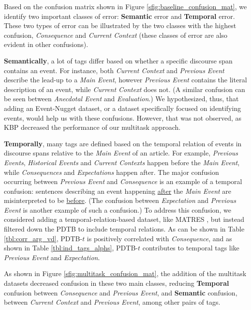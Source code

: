 \documentclass[11pt]{article}
\begin{document}
Based on the confusion matrix shown in Figure \ref{sfig:baseline_confusion_mat}, we identify two important classes of error: \textbf{Semantic} error and \textbf{Temporal} error. These two types of error can be illustrated by the two classes with the highest confusion, \textit{Consequence} and \textit{Current Context} (these classes of error are also evident in other confusions). 

\textbf{Semantically}, a lot of tags differ based on whether a specific discourse span contains an event. For instance, both \textit{Current Context} and \textit{Previous Event} describe the lead-up to a \textit{Main Event}, however \textit{Previous Event} contains the literal description of an event, while \textit{Current Context} does not. (A similar confusion can be seen between \textit{Anecdotal Event} and \textit{Evaluation}.) We hypothesized, thus, that adding an Event-Nugget dataset, or a dataset specifically focused on identifying events, would help us with these confusions. However, that was not observed, as KBP decreased the performance of our multitask approach.

\textbf{Temporally}, many tags are defined based on the temporal relation of events in discourse spans relative to the \textit{Main Event} of an article. For example, \textit{Previous Events}, \textit{Historical Events} and \textit{Current Contexts} happen before the \textit{Main Event}, while \textit{Consequences} and \textit{Expectations} happen after. The major confusion occurring between \textit{Previous Event} and \textit{Consequence} is an example of a temporal confusion: sentences describing an event happening \underline{after} the \textit{Main Event} are misinterpreted to be \underline{before}. (The confusion between \textit{Expectation} and \textit{Previous Event} is another example of such a confusion.) To address this confusion, we considered adding a temporal-relation-based dataset, like MATRES \cite{ning2018multi}, but instead filtered down the PDTB to include temporal relations. As can be shown in Table \ref{tbl:corr_arg_vd}, PDTB-$t$ is positively correlated with \textit{Consequence}, and as shown in Table \ref{tbl:ind_tags_alphs}, PDTB-$t$ contributes to temporal tags like \textit{Previous Event} and \textit{Expectation}.

As shown in Figure \ref{sfig:multitask_confusion_mat}, the addition of the multitask datasets decreased confusion in these two main classes, reducing \textbf{Temporal} confusion between \textit{Consequence} and \textit{Previous Event}, and \textbf{Semantic} confusion, between \textit{Current Context} and \textit{Previous Event}, among other pairs of tags.
\end{document}
